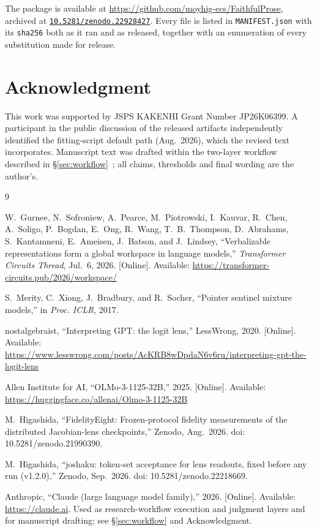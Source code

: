 \documentclass[11pt]{article}
\newcommand{\REPOURL}{\url{https://github.com/moyhig-ecs/FaithfulProse}}
\newcommand{\REPODOI}{10.5281/zenodo.22928427}
\newcommand{\DOICLAUSE}{, archived at \href{https://doi.org/\REPODOI}{\texttt{\REPODOI}}}
\begin{document}
The package is available at \REPOURL{}\DOICLAUSE{}. Every file is listed in
\texttt{MANIFEST.json} with its \texttt{sha256} both as it ran and as
released, together with an enumeration of every substitution made for
release.

\section*{Acknowledgment}

This work was supported by JSPS KAKENHI Grant Number JP26K06399.
A participant in the public discussion of the released artifacts
independently identified the fitting-script default path (Aug.~2026),
which the revised text incorporates.
Manuscript text was drafted within the two-layer workflow described in
\S\ref{sec:workflow}~\cite{anthropic2026claude}; all claims, thresholds
and final wording are the author's.

\begin{thebibliography}{9}

W.~Gurnee, N.~Sofroniew, A.~Pearce, M.~Piotrowski, I.~Kauvar, R.~Chen,
A.~Soligo, P.~Bogdan, E.~Ong, R.~Wang, T.~B.~Thompson, D.~Abrahams,
S.~Kantamneni, E.~Ameisen, J.~Batson, and J.~Lindsey,
``Verbalizable representations form a global workspace in language
models,'' \emph{Transformer Circuits Thread}, Jul.~6, 2026. [Online].
Available: \url{https://transformer-circuits.pub/2026/workspace/}

S.~Merity, C.~Xiong, J.~Bradbury, and R.~Socher, ``Pointer sentinel mixture
models,'' in \emph{Proc. ICLR}, 2017.

nostalgebraist, ``Interpreting GPT: the logit lens,'' LessWrong, 2020.
[Online]. Available:
\url{https://www.lesswrong.com/posts/AcKRB8wDpdaN6v6ru/interpreting-gpt-the-logit-lens}

Allen Institute for AI, ``OLMo-3-1125-32B,'' 2025. [Online]. Available:
\url{https://huggingface.co/allenai/Olmo-3-1125-32B}

 M.~Higashida, ``FidelityEight: Frozen-protocol fidelity measurements of the distributed Jacobian-lens checkpoints,'' Zenodo, Aug.~2026. doi: 10.5281/zenodo.21990390.

 M.~Higashida, ``joshaku: token-set acceptance for lens readouts, fixed before any run (v1.2.0),'' Zenodo, Sep.~2026. doi: 10.5281/zenodo.22218669.

Anthropic, ``Claude (large language model family),'' 2026. [Online].
Available: \url{https://claude.ai}. Used as research-workflow execution
and judgment layers and for manuscript drafting; see
\S\ref{sec:workflow} and Acknowledgment.

\end{thebibliography}
\end{document}
